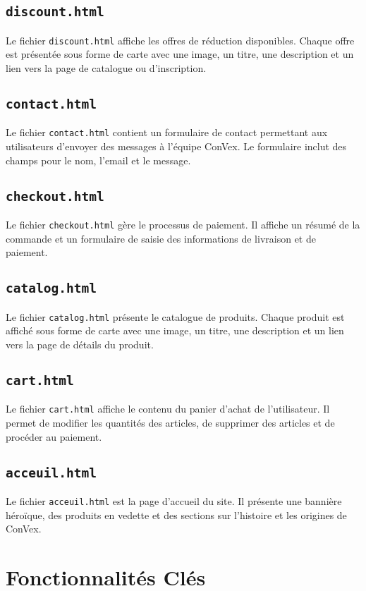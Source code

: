 \documentclass[12pt,a4paper]{article}
\begin{document}
\subsection{\texttt{discount.html}}
Le fichier \texttt{discount.html} affiche les offres de réduction disponibles. Chaque offre est présentée sous forme de carte avec une image, un titre, une description et un lien vers la page de catalogue ou d'inscription.

\subsection{\texttt{contact.html}}
Le fichier \texttt{contact.html} contient un formulaire de contact permettant aux utilisateurs d'envoyer des messages à l'équipe ConVex. Le formulaire inclut des champs pour le nom, l'email et le message.

\subsection{\texttt{checkout.html}}
Le fichier \texttt{checkout.html} gère le processus de paiement. Il affiche un résumé de la commande et un formulaire de saisie des informations de livraison et de paiement.

\subsection{\texttt{catalog.html}}
Le fichier \texttt{catalog.html} présente le catalogue de produits. Chaque produit est affiché sous forme de carte avec une image, un titre, une description et un lien vers la page de détails du produit.

\subsection{\texttt{cart.html}}
Le fichier \texttt{cart.html} affiche le contenu du panier d'achat de l'utilisateur. Il permet de modifier les quantités des articles, de supprimer des articles et de procéder au paiement.

\subsection{\texttt{acceuil.html}}
Le fichier \texttt{acceuil.html} est la page d'accueil du site. Il présente une bannière héroïque, des produits en vedette et des sections sur l'histoire et les origines de ConVex.

\section{Fonctionnalités Clés}
\end{document}
